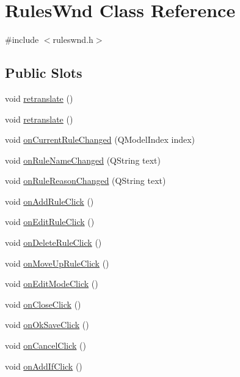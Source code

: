 \hypertarget{class_rules_wnd}{
\section{RulesWnd Class Reference}
\label{class_rules_wnd}
}


{\ttfamily \#include $<$ruleswnd.h$>$}

\subsection*{Public Slots}
\begin{DoxyCompactItemize}
\item 
void \hyperlink{class_rules_wnd_ae447344e996476f2d34ee9312d2b53c2}{retranslate} ()
\item 
void \hyperlink{class_rules_wnd_ae447344e996476f2d34ee9312d2b53c2}{retranslate} ()
\item 
void \hyperlink{class_rules_wnd_a8150f1a8523df50614e244e53f124597}{onCurrentRuleChanged} (QModelIndex index)
\item 
void \hyperlink{class_rules_wnd_a9ec2e5369c1d22180b4dd9863e544f50}{onRuleNameChanged} (QString text)
\item 
void \hyperlink{class_rules_wnd_abd94f4267220da61e6b2b17a34f0d9b6}{onRuleReasonChanged} (QString text)
\item 
void \hyperlink{class_rules_wnd_a450cb43dffe6071ce23a2fec433dd813}{onAddRuleClick} ()
\item 
void \hyperlink{class_rules_wnd_a5a86d5777fb331aae59389aaca5e4533}{onEditRuleClick} ()
\item 
void \hyperlink{class_rules_wnd_a739a224ae93f4ce517e87d9e909a9e65}{onDeleteRuleClick} ()
\item 
void \hyperlink{class_rules_wnd_aac1e7d006451386d7ffd35f36d312950}{onMoveUpRuleClick} ()
\item 
void \hyperlink{class_rules_wnd_a3d07682984e6921b86aaf3debe899d4b}{onEditModeClick} ()
\item 
void \hyperlink{class_rules_wnd_a9ff1e5a9649409917776164e554bc0ca}{onCloseClick} ()
\item 
void \hyperlink{class_rules_wnd_a0458a2000b1e9b11f4230965499da8c1}{onOkSaveClick} ()
\item 
void \hyperlink{class_rules_wnd_adc9f31fc930cb24e31d5c6fb2280ef49}{onCancelClick} ()
\item 
void \hyperlink{class_rules_wnd_a03a25da9fc898ed19e5cab37d3f3f1a8}{onAddIfClick} ()
\item 

\end{DoxyCompactItemize}
